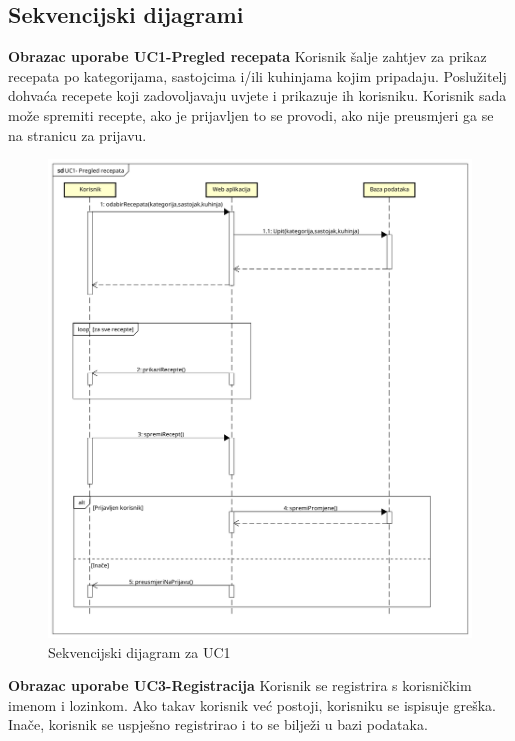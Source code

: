 				\eject		
				
			\subsection{Sekvencijski dijagrami}
				
				\noindent
				\textbf{Obrazac uporabe UC1-Pregled recepata}\newline
					{Korisnik šalje zahtjev za prikaz recepata po kategorijama, sastojcima i/ili kuhinjama kojim pripadaju. Poslužitelj dohvaća recepete koji zadovoljavaju uvjete i prikazuje ih korisniku. Korisnik sada može spremiti recepte, ako je prijavljen to se provodi, ako nije preusmjeri ga se na stranicu za prijavu.}
				
				
				\begin{figure}[H]
					\includegraphics[scale= 0.4]{slike/sekvencijski_dijagramUC1.png}
					\centering
					\caption{Sekvencijski dijagram za UC1}
					\label{fig:Sekvencijski dijagram za UC1}
				\end{figure} 
				\eject

				\noindent
				\textbf{Obrazac uporabe UC3-Registracija}\newline
					{Korisnik se registrira s korisničkim imenom i lozinkom. Ako takav korisnik već postoji, korisniku se ispisuje greška. Inače, korisnik se uspješno registrirao i to se bilježi u bazi podataka.}
				

